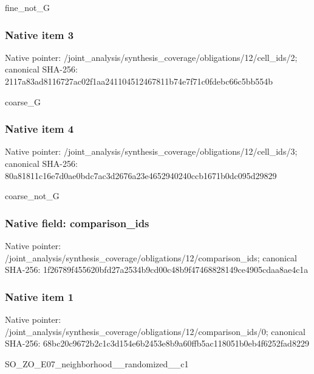 \documentclass[10pt,a4paper]{article}
\begin{document}
\begingroup\raggedright\sloppy fine\_\allowbreak{}not\_\allowbreak{}G\par\endgroup

\subsubsection{Native item 3}
Native pointer: /joint\_\allowbreak{}analysis/synthesis\_\allowbreak{}coverage/obligations/12/cell\_\allowbreak{}ids/2; canonical SHA-256: 2117a83ad8116727ac02f1aa241104512467811b74e7f71c0fdebc66c5bb554b

\begingroup\raggedright\sloppy coarse\_\allowbreak{}G\par\endgroup

\subsubsection{Native item 4}
Native pointer: /joint\_\allowbreak{}analysis/synthesis\_\allowbreak{}coverage/obligations/12/cell\_\allowbreak{}ids/3; canonical SHA-256: 80a81811c16e7d0ae0bdc7ac3d2676a23e4652940240ccb1671b0dc095d29829

\begingroup\raggedright\sloppy coarse\_\allowbreak{}not\_\allowbreak{}G\par\endgroup

\subsubsection{Native field: comparison\_\allowbreak{}ids}
Native pointer: /joint\_\allowbreak{}analysis/synthesis\_\allowbreak{}coverage/obligations/12/comparison\_\allowbreak{}ids; canonical SHA-256: 1f26789f455620bfd27a2534b9cd00c48b9f47468828149ce4905cdaa8ae4c1a

\subsubsection{Native item 1}
Native pointer: /joint\_\allowbreak{}analysis/synthesis\_\allowbreak{}coverage/obligations/12/comparison\_\allowbreak{}ids/0; canonical SHA-256: 68bc20c9672b2c1c3d154e6b2453e8b9a60ffb5ac118051b0eb4f6252fad8229

\begingroup\raggedright\sloppy SO\_\allowbreak{}ZO\_\allowbreak{}E07\_\allowbreak{}neighborhood\_\allowbreak{}\_\allowbreak{}randomized\_\allowbreak{}\_\allowbreak{}c1\par\endgroup
\end{document}
